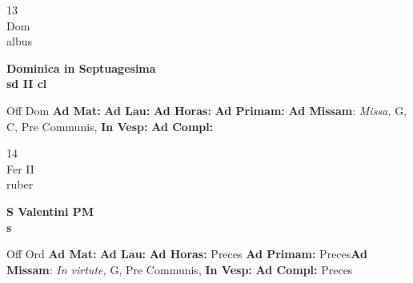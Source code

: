 \documentclass[10pt, openany]{book}
\begin{document}
        \begin{center}
            \begin{minipage}{3.5in}
                \vspace{2em}
                \begin{minipage}{0.5in}
                    {\Huge 13} \\
                    {\normalsize Dom} \\
                    {\normalsize albus}
                \end{minipage}
                \begin{minipage}{3.0in}
                    \textbf{ \large Dominica in Septuagesima \\
                    \textnormal{\normalsize sd II cl}} \\ 
                \end{minipage}
                \begin{justify}Off Dom
                    \textbf{Ad Mat: }
                    \textbf{Ad Lau: }
                    \textbf{Ad Horas: }
                    \textbf{Ad Primam: }\textbf{Ad Missam}: \textit{Missa,} G, C, Pre Communis,  
                    \textbf{In Vesp: }
                    \textbf{Ad Compl: }
                \end{justify}
            \end{minipage}
        \end{center}
    
        \begin{center}
            \begin{minipage}{3.5in}
                \vspace{2em}
                \begin{minipage}{0.5in}
                    {\Huge 14} \\
                    {\normalsize Fer II} \\
                    {\normalsize ruber}
                \end{minipage}
                \begin{minipage}{3.0in}
                    \textbf{ \large S Valentini PM \\
                    \textnormal{\normalsize s}} \\ 
                \end{minipage}
                \begin{justify}Off Ord
                    \textbf{Ad Mat: }
                    \textbf{Ad Lau: }
                    \textbf{Ad Horas: }Preces
                    \textbf{Ad Primam: }Preces\textbf{Ad Missam}: \textit{In virtute,} G, Pre Communis,  
                    \textbf{In Vesp: }
                    \textbf{Ad Compl: }Preces
                \end{justify}
            \end{minipage}
        \end{center}
    
\end{document}

